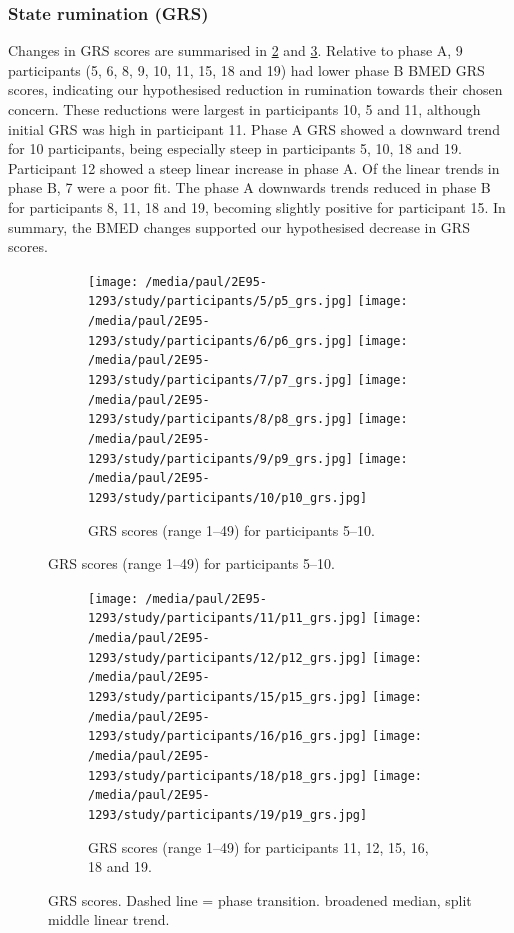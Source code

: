 \documentclass[man,floatsintext,a4paper,biblatex]{apa6}\usepackage[]{graphicx}\usepackage[]{color}
\newcommand\strokeA{\tikz[baseline=-.5ex]{ \draw[black,thick,align=center] (0,0) -- (2ex,0); }}
\newcommand\strokeB{\tikz[baseline=-.5ex]{ \draw[red,thick,dotted] (0,0) -- (2ex,0); }}
\begin{document}
\subsubsection{State rumination (GRS)}

Changes in GRS scores are summarised in \cref{fig:va-grs-a} and
\cref{fig:va-grs-b}. Relative to phase A, 9 participants (5, 6, 8, 9, 10,
11, 15, 18 and 19) had lower phase B BMED GRS scores, indicating our hypothesised
reduction in rumination towards their chosen concern. These reductions
were largest in participants 10, 5 and 11, although initial GRS was
high in participant 11. Phase A GRS showed a downward trend for 10
participants, being especially steep in participants 5, 10, 18 and
19. Participant 12 showed a steep linear increase in phase A. Of the
linear trends in phase B, 7 were a poor fit. The phase A downwards trends
reduced in phase B for participants 8, 11, 18 and 19, becoming slightly
positive for participant 15. In summary, the BMED changes supported our
hypothesised decrease in GRS scores.

\begin{figure}[!htbp]
  \begin{subfigure}[!htbp]{\textwidth}
    \texttt{[image: /media/paul/2E95-1293/study/participants/5/p5\_grs.jpg]}
    \texttt{[image: /media/paul/2E95-1293/study/participants/6/p6\_grs.jpg]}
    \texttt{[image: /media/paul/2E95-1293/study/participants/7/p7\_grs.jpg]}
    \texttt{[image: /media/paul/2E95-1293/study/participants/8/p8\_grs.jpg]}
    \texttt{[image: /media/paul/2E95-1293/study/participants/9/p9\_grs.jpg]}
    \texttt{[image: /media/paul/2E95-1293/study/participants/10/p10\_grs.jpg]}
    \caption{GRS scores (range 1--49) for participants 5--10.}
    \label{fig:va-grs-a}
  \end{subfigure}
\end{figure}

\begin{figure}
\ContinuedFloat
  \begin{subfigure}[!htbp]{\textwidth}
    \texttt{[image: /media/paul/2E95-1293/study/participants/11/p11\_grs.jpg]}
    \texttt{[image: /media/paul/2E95-1293/study/participants/12/p12\_grs.jpg]}
    \texttt{[image: /media/paul/2E95-1293/study/participants/15/p15\_grs.jpg]}
    \texttt{[image: /media/paul/2E95-1293/study/participants/16/p16\_grs.jpg]}
    \texttt{[image: /media/paul/2E95-1293/study/participants/18/p18\_grs.jpg]}
    \texttt{[image: /media/paul/2E95-1293/study/participants/19/p19\_grs.jpg]}
    \caption{GRS scores (range 1--49) for participants 11, 12, 15, 16, 18 and 19.}
    \label{fig:va-grs-b}
  \end{subfigure}
\caption{GRS scores. Dashed line = phase transition. \protect\strokeA{} broadened
median, \protect\strokeB{} split middle linear trend.}
\label{fig:grs}
\end{figure}
\clearpage
\end{document}
